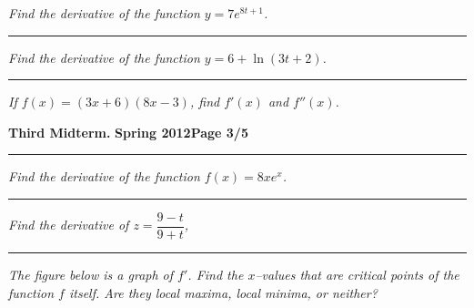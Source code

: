 \documentclass[12pt]{article}
\begin{document}
\bigskip
{\problem[10 pts] \em Find the derivative of the function
  $y=7e^{8t+1}$.}
\vspace{4.5cm}
\begin{flushright}
\end{flushright}
\hrule
{\problem[10 pts] \em Find the derivative of the function $y=6+\ln
  (3t+2)$.}
\vspace{4.5cm}
\begin{flushright}
\end{flushright}

\hrule
{\problem[10 pts] \em If $f(x)=(3x+6)(8x-3)$, find $f'(x)$ and
  $f''(x)$.}
\vspace{3cm}
\begin{flushright}
\end{flushright}
\newpage

\hfill{\large\bf Third Midterm.}\hfill{\large\bf
  Spring 2012}\hfill{\large\bf Page 3/5}\hrule

\bigskip
{\problem[10 pts] \em Find the derivative of the function
  $f(x)=8xe^x$.}
\vspace{4.5cm}
\begin{flushright}
\end{flushright}
\hrule
{\problem[10 pts] \em  Find the derivative of $z=\dfrac{9-t}{9+t}$,}
\vspace{4.5cm}
\begin{flushright}
\end{flushright}
\hrule
{\problem[10 pts] \em The figure below is a graph of $f'$.  Find the
  $x$--values that are critical points of the function $f$ itself.
  Are they local maxima, local minima, or neither?}
\end{document}
